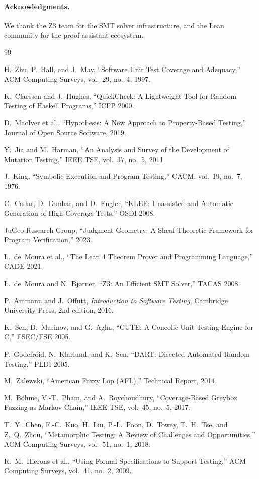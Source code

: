 \documentclass[11pt]{article}
\begin{document}
\paragraph{Acknowledgments.}
We thank the Z3 team for the SMT solver infrastructure, and the Lean
community for the proof assistant ecosystem.

\begin{thebibliography}{99}

H.~Zhu, P.~Hall, and J.~May, ``Software Unit Test Coverage and Adequacy,''
ACM Computing Surveys, vol.~29, no.~4, 1997.

K.~Claessen and J.~Hughes, ``QuickCheck: A Lightweight Tool for Random
Testing of Haskell Programs,'' ICFP 2000.

D.~MacIver et al., ``Hypothesis: A New Approach to Property-Based Testing,''
Journal of Open Source Software, 2019.

Y.~Jia and M.~Harman, ``An Analysis and Survey of the Development of
Mutation Testing,'' IEEE TSE, vol.~37, no.~5, 2011.

J.~King, ``Symbolic Execution and Program Testing,'' CACM, vol.~19, no.~7,
1976.

C.~Cadar, D.~Dunbar, and D.~Engler, ``KLEE: Unassisted and Automatic
Generation of High-Coverage Tests,'' OSDI 2008.

JuGeo Research Group, ``Judgment Geometry: A Sheaf-Theoretic Framework for
Program Verification,'' 2023.

L.~de~Moura et al., ``The Lean 4 Theorem Prover and Programming Language,''
CADE 2021.

L.~de~Moura and N.~Bjørner, ``Z3: An Efficient SMT Solver,'' TACAS 2008.

P.~Ammann and J.~Offutt, \emph{Introduction to Software Testing},
Cambridge University Press, 2nd edition, 2016.

K.~Sen, D.~Marinov, and G.~Agha, ``CUTE: A Concolic Unit Testing Engine
for C,'' ESEC/FSE 2005.

P.~Godefroid, N.~Klarlund, and K.~Sen, ``DART: Directed Automated Random
Testing,'' PLDI 2005.

M.~Zalewski, ``American Fuzzy Lop (AFL),'' Technical Report, 2014.

M.~B\"ohme, V.-T.~Pham, and A.~Roychoudhury, ``Coverage-Based Greybox
Fuzzing as Markov Chain,'' IEEE TSE, vol.~45, no.~5, 2017.

T.~Y.~Chen, F.-C.~Kuo, H.~Liu, P.-L.~Poon, D.~Towey, T.~H.~Tse, and
Z.~Q.~Zhou, ``Metamorphic Testing: A Review of Challenges and
Opportunities,'' ACM Computing Surveys, vol.~51, no.~1, 2018.

R.~M.~Hierons et al., ``Using Formal Specifications to Support Testing,''
ACM Computing Surveys, vol.~41, no.~2, 2009.

\end{thebibliography}
\end{document}
